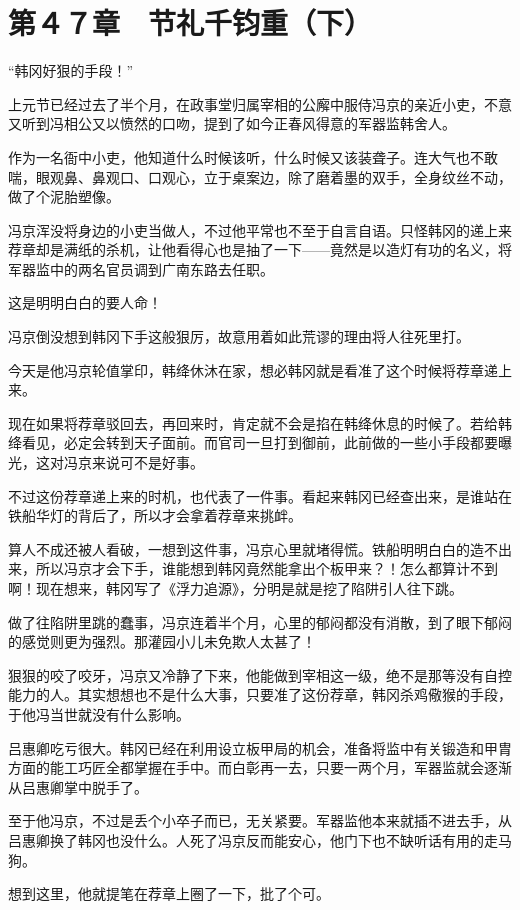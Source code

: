\section{第４７章　节礼千钧重（下）}

“韩冈好狠的手段！”

上元节已经过去了半个月，在政事堂归属宰相的公廨中服侍冯京的亲近小吏，不意又听到冯相公又以愤然的口吻，提到了如今正春风得意的军器监韩舍人。

作为一名衙中小吏，他知道什么时候该听，什么时候又该装聋子。连大气也不敢喘，眼观鼻、鼻观口、口观心，立于桌案边，除了磨着墨的双手，全身纹丝不动，做了个泥胎塑像。

冯京浑没将身边的小吏当做人，不过他平常也不至于自言自语。只怪韩冈的递上来荐章却是满纸的杀机，让他看得心也是抽了一下——竟然是以造灯有功的名义，将军器监中的两名官员调到广南东路去任职。

这是明明白白的要人命！

冯京倒没想到韩冈下手这般狠厉，故意用着如此荒谬的理由将人往死里打。

今天是他冯京轮值掌印，韩绛休沐在家，想必韩冈就是看准了这个时候将荐章递上来。

现在如果将荐章驳回去，再回来时，肯定就不会是掐在韩绛休息的时候了。若给韩绛看见，必定会转到天子面前。而官司一旦打到御前，此前做的一些小手段都要曝光，这对冯京来说可不是好事。

不过这份荐章递上来的时机，也代表了一件事。看起来韩冈已经查出来，是谁站在铁船华灯的背后了，所以才会拿着荐章来挑衅。

算人不成还被人看破，一想到这件事，冯京心里就堵得慌。铁船明明白白的造不出来，所以冯京才会下手，谁能想到韩冈竟然能拿出个板甲来？！怎么都算计不到啊！现在想来，韩冈写了《浮力追源》，分明是就是挖了陷阱引人往下跳。

做了往陷阱里跳的蠢事，冯京连着半个月，心里的郁闷都没有消散，到了眼下郁闷的感觉则更为强烈。那灌园小儿未免欺人太甚了！

狠狠的咬了咬牙，冯京又冷静了下来，他能做到宰相这一级，绝不是那等没有自控能力的人。其实想想也不是什么大事，只要准了这份荐章，韩冈杀鸡儆猴的手段，于他冯当世就没有什么影响。

吕惠卿吃亏很大。韩冈已经在利用设立板甲局的机会，准备将监中有关锻造和甲胄方面的能工巧匠全都掌握在手中。而白彰再一去，只要一两个月，军器监就会逐渐从吕惠卿掌中脱手了。

至于他冯京，不过是丢个小卒子而已，无关紧要。军器监他本来就插不进去手，从吕惠卿换了韩冈也没什么。人死了冯京反而能安心，他门下也不缺听话有用的走马狗。

想到这里，他就提笔在荐章上圈了一下，批了个可。


